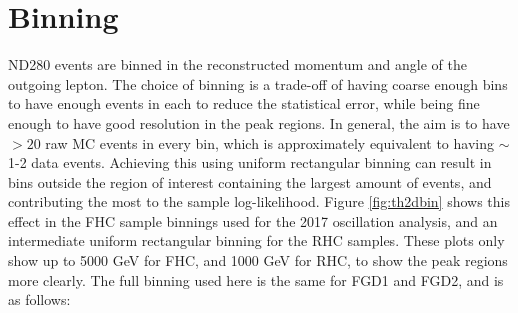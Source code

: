 \section{Binning}\label{sec:binning}

ND280 events are binned in the reconstructed momentum and angle of the outgoing lepton. The choice of binning is a trade-off of having coarse enough bins to have enough events in each to reduce the statistical error, while being fine enough to have good resolution in the peak regions. In general, the aim is to have $>20$ raw MC events in every bin, which is approximately equivalent to having $\sim$1-2 data events. Achieving this using uniform rectangular binning can result in bins outside the region of interest containing the largest amount of events, and contributing the most to the sample log-likelihood. Figure \ref{fig:th2dbin} shows this effect in the FHC sample binnings used for the 2017 oscillation analysis, and an intermediate uniform rectangular binning for the RHC samples. These plots only show up to 5000 GeV for FHC, and 1000 GeV for RHC, to show the peak regions more clearly. The full binning used here is the same for FGD1 and FGD2, and is as follows:

